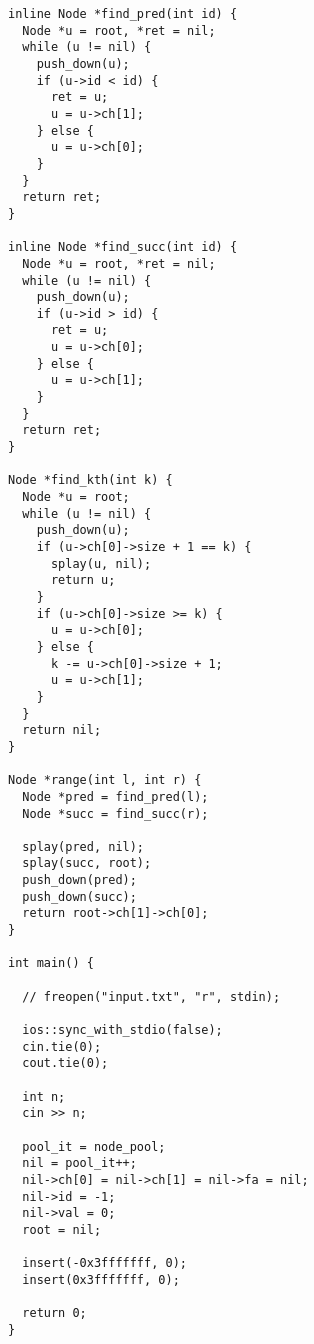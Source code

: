 \documentclass[twoside]{article}
\begin{document}
\begin{lstlisting}
inline Node *find_pred(int id) {
  Node *u = root, *ret = nil;
  while (u != nil) {
    push_down(u);
    if (u->id < id) {
      ret = u;
      u = u->ch[1];
    } else {
      u = u->ch[0];
    }
  }
  return ret;
}

inline Node *find_succ(int id) {
  Node *u = root, *ret = nil;
  while (u != nil) {
    push_down(u);
    if (u->id > id) {
      ret = u;
      u = u->ch[0];
    } else {
      u = u->ch[1];
    }
  }
  return ret;
}

Node *find_kth(int k) {
  Node *u = root;
  while (u != nil) {
    push_down(u);
    if (u->ch[0]->size + 1 == k) {
      splay(u, nil);
      return u;
    }
    if (u->ch[0]->size >= k) {
      u = u->ch[0];
    } else {
      k -= u->ch[0]->size + 1;
      u = u->ch[1];
    }
  }
  return nil;
}

Node *range(int l, int r) {
  Node *pred = find_pred(l);
  Node *succ = find_succ(r);

  splay(pred, nil);
  splay(succ, root);
  push_down(pred);
  push_down(succ);
  return root->ch[1]->ch[0];
}

int main() {

  // freopen("input.txt", "r", stdin);

  ios::sync_with_stdio(false);
  cin.tie(0);
  cout.tie(0);

  int n;
  cin >> n;

  pool_it = node_pool;
  nil = pool_it++;
  nil->ch[0] = nil->ch[1] = nil->fa = nil;
  nil->id = -1;
  nil->val = 0;
  root = nil;

  insert(-0x3fffffff, 0);
  insert(0x3fffffff, 0);

  return 0;
}

\end{lstlisting}
\end{document}
